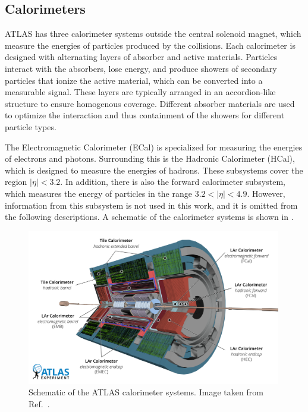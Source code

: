 \subsection{Calorimeters}

ATLAS has three calorimeter systems outside the central solenoid magnet, which measure the energies of particles produced by the collisions.
Each calorimeter is designed with alternating layers of absorber and active materials.
Particles interact with the absorbers, lose energy, and produce showers of secondary particles that ionize the active material, which can be converted into a measurable signal.
These layers are typically arranged in an accordion-like structure to ensure homogenous coverage.
Different absorber materials are used to optimize the interaction and thus containment of the showers for different particle types.

The Electromagnetic Calorimeter (ECal) is specialized for measuring the energies of electrons and photons.
Surrounding this is the Hadronic Calorimeter (HCal), which is designed to measure the energies of hadrons.
These subsystems cover the region $|\eta| < 3.2$.
In addition, there is also the forward calorimeter subsystem, which measures the energy of particles in the range $3.2 < |\eta| < 4.9$.
However, information from this subsystem is not used in this work, and it is omitted from the following descriptions.
A schematic of the calorimeter systems is shown in .

\begin{figure}[htb]
    \centering
    \includegraphics[width=0.99\textwidth]{Figures/cern_atlas/Calos.png}
    \caption{Schematic of the ATLAS calorimeter systems. Image taken from Ref.~\cite{ATLASRun3}.}
    \label{fig:atlas_calorimeters}
\end{figure}

